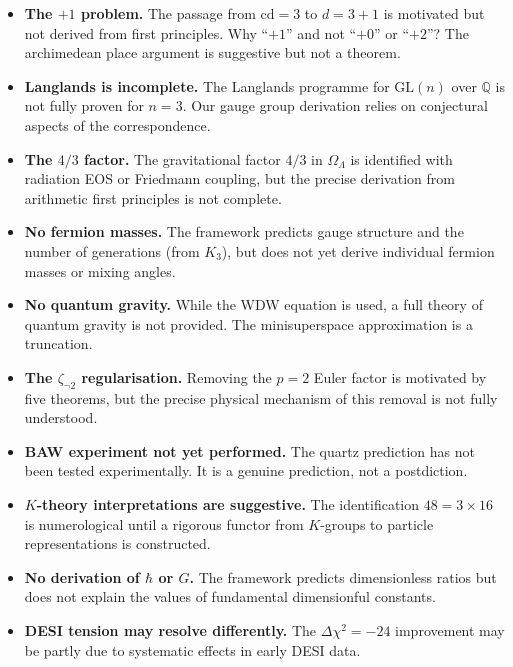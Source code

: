 \documentclass[12pt,a4paper]{article}
\theoremstyle{definition}
\newcommand{\cd}{\mathrm{cd}}
\newcommand{\GL}{\mathrm{GL}}
\newcommand{\Q}{\mathbb{Q}}
\newcommand{\OmL}{\Omega_\Lambda}
\newcommand{\zetanot}{\zeta_{\neg 2}}
\begin{document}
\begin{itemize}
\item \textbf{The $+1$ problem.}  The passage from $\cd=3$ to $d=3+1$ is motivated
  but not derived from first principles.  Why ``$+1$'' and not ``$+0$'' or ``$+2$''?
  The archimedean place argument is suggestive but not a theorem.

\item \textbf{Langlands is incomplete.}  The Langlands programme for $\GL(n)$ over $\Q$
  is not fully proven for $n=3$.  Our gauge group derivation relies on conjectural
  aspects of the correspondence.

\item \textbf{The $4/3$ factor.}  The gravitational factor $4/3$ in $\OmL$ is identified
  with radiation EOS or Friedmann coupling, but the precise derivation from
  arithmetic first principles is not complete.

\item \textbf{No fermion masses.}  The framework predicts gauge structure and
  the number of generations (from $K_3$), but does not yet derive individual
  fermion masses or mixing angles.

\item \textbf{No quantum gravity.}  While the WDW equation is used, a full theory of
  quantum gravity is not provided.  The minisuperspace approximation is a truncation.

\item \textbf{The $\zetanot$ regularisation.}  Removing the $p=2$ Euler factor is
  motivated by five theorems, but the precise physical mechanism of this removal
  is not fully understood.

\item \textbf{BAW experiment not yet performed.}  The quartz prediction has not been
  tested experimentally.  It is a genuine prediction, not a postdiction.

\item \textbf{$K$-theory interpretations are suggestive.}  The identification
  $48=3\times 16$ is numerological until a rigorous functor from $K$-groups to
  particle representations is constructed.

\item \textbf{No derivation of $\hbar$ or $G$.}  The framework predicts dimensionless
  ratios but does not explain the values of fundamental dimensionful constants.

\item \textbf{DESI tension may resolve differently.}  The $\Delta\chi^2=-24$
  improvement may be partly due to systematic effects in early DESI data.
\end{itemize}
\end{document}
